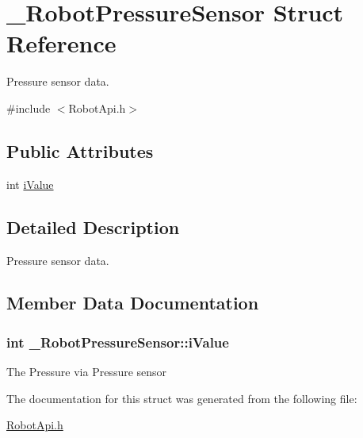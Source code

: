 \hypertarget{struct__RobotPressureSensor}{\section{\-\_\-\-Robot\-Pressure\-Sensor Struct Reference}
\label{struct__RobotPressureSensor}
}


Pressure sensor data.  




{\ttfamily \#include $<$Robot\-Api.\-h$>$}

\subsection*{Public Attributes}
\begin{DoxyCompactItemize}
\item 
int \hyperlink{struct__RobotPressureSensor_aa8cde267cdbc78067d0589e15e9fb15d}{i\-Value}
\end{DoxyCompactItemize}


\subsection{Detailed Description}
Pressure sensor data. 

\subsection{Member Data Documentation}
\hypertarget{struct__RobotPressureSensor_aa8cde267cdbc78067d0589e15e9fb15d}{
\subsubsection[{i\-Value}]{\setlength{\rightskip}{0pt plus 5cm}int \-\_\-\-Robot\-Pressure\-Sensor\-::i\-Value}}\label{struct__RobotPressureSensor_aa8cde267cdbc78067d0589e15e9fb15d}
The Pressure via Pressure sensor 

The documentation for this struct was generated from the following file\-:\begin{DoxyCompactItemize}
\item 
\hyperlink{RobotApi_8h}{Robot\-Api.\-h}\end{DoxyCompactItemize}

